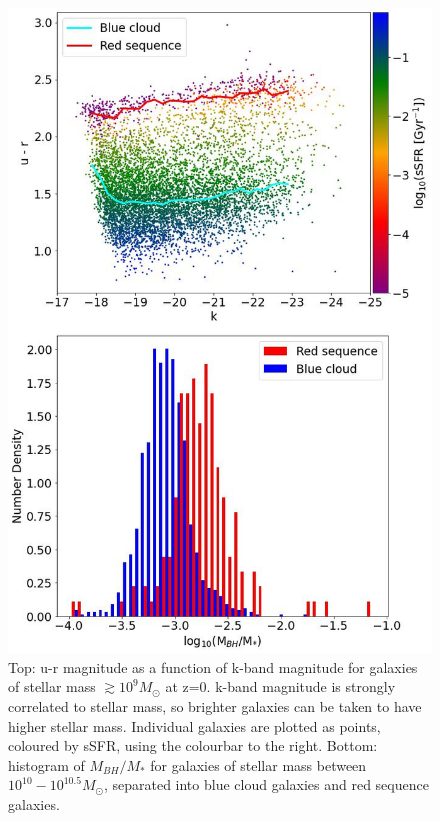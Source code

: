 \documentclass[12pt, twocolumn]{article}%
\begin{document}
\begin{figure}[H]
\centering
\includegraphics[width=14.5cm]{Plot_1.jpeg}
\caption{Top: u-r magnitude as a function of k-band magnitude for galaxies of stellar mass $\gtrsim10^9M_\odot$ at z=0. k-band magnitude is strongly correlated to stellar mass, so brighter galaxies can be taken to have higher stellar mass. Individual galaxies are plotted as points, coloured by sSFR, using the colourbar to the right. Bottom: histogram of $M_{BH}/M_*$ for galaxies of stellar mass between $10^{10} - 10^{10.5}M_\odot$, separated into blue cloud galaxies and red sequence galaxies.}
\label{fig:2}
\end{figure}
\twocolumngrid
\end{document}
